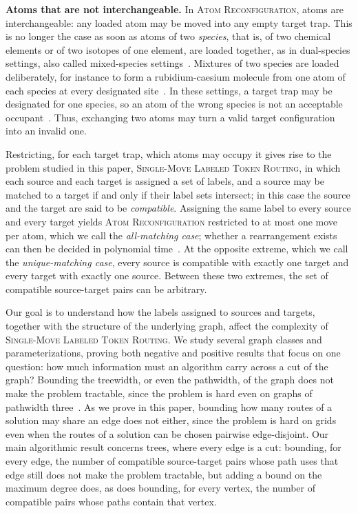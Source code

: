 \documentclass[a4paper,USenglish,thm-restate]{lipics-v2021}
\theoremstyle{problemstyle}
\begin{document}
\smallskip
\noindent\textbf{Atoms that are not interchangeable.}
In \textsc{Atom Reconfiguration}, atoms are interchangeable: any
loaded atom may be moved into any empty target trap. This is no longer the case
as soon as atoms of two \emph{species}, that is, of two chemical elements or of
two isotopes of one element, are loaded together, as in dual-species
settings, also called
mixed-species settings~\cite{Anand2024DualSpeciesRydberg,Fang2025Interleaved,Sheng2022MixedSpecies,Wei2026MixedSpecies}.
Mixtures of two species are loaded deliberately, for instance to form a
rubidium-caesium molecule from one atom of each species at every designated
site~\cite{Ruttley2023MergingTweezers,Ruttley2024MoleculeArrays}. In these
settings, a target trap may be designated for one species, so an atom of the
wrong species is not an acceptable occupant~\cite{Sheng2022MixedSpecies,Wei2026MixedSpecies}.
Thus, exchanging two atoms may turn a valid target configuration into an
invalid one.

Restricting, for each target trap, which atoms may occupy it gives rise
to the problem studied in this paper, \textsc{Single-Move Labeled Token Routing}, in which each source and
each target is assigned a set of labels, and a source may be matched to a target
if and only if their label sets intersect; in this case the source and the
target are said to be \emph{compatible}. Assigning the same label to every
source and every target yields \textsc{Atom Reconfiguration} restricted to at
most one move per atom, which
we call the \emph{all-matching case}; whether a rearrangement exists can
then be decided in polynomial
time~\cite{Calinescu2008Reconfigurations,ElSabeh2023ARO,Cooper2024ParameterizedAtoms}.
At the opposite extreme, which we call the \emph{unique-matching case},
every source is compatible with exactly one target and every target with
exactly one source. Between these two extremes, the set of compatible source-target pairs can be
arbitrary.

Our goal is to understand how the labels assigned to sources and targets,
together with the structure of the underlying graph, affect the complexity of
\textsc{Single-Move Labeled Token Routing}. We study several graph classes and
parameterizations, proving both negative and positive results that focus on one question: how much information must an algorithm carry across a cut of
the graph? Bounding the treewidth, or even the pathwidth, of the graph does not make
the problem tractable, since the problem is hard even on graphs of pathwidth
three~\cite{GeftHalperinNakar2024}. As we prove in this paper, bounding how many routes of a solution may
share an edge does not either, since the problem is hard on grids even when
the routes of a solution can be chosen pairwise edge-disjoint.
Our main algorithmic result concerns trees, where every edge is a cut:
bounding, for every edge, the number of compatible source-target pairs whose
path uses that edge still does not make the problem tractable, but adding a
bound on the maximum degree does, as does bounding, for every vertex, the
number of compatible pairs whose paths contain that vertex.
\end{document}
